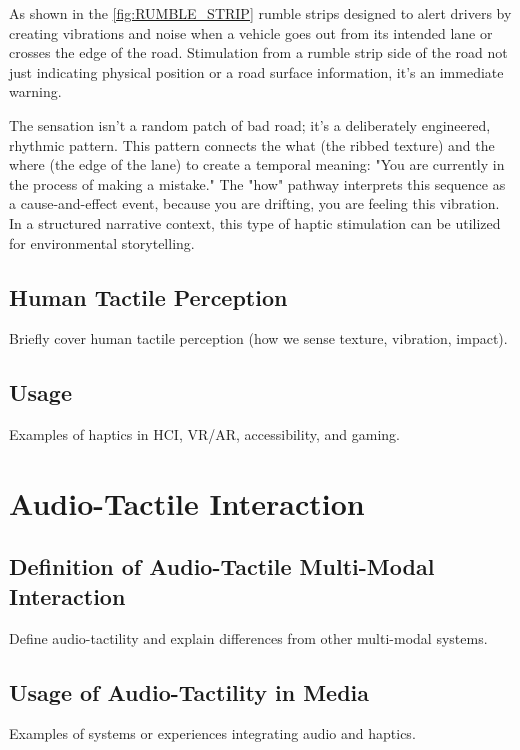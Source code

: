             As shown in the \ref{fig:RUMBLE_STRIP} rumble strips designed to alert drivers by creating vibrations and noise when a vehicle goes out from its intended lane or crosses the edge of the road. Stimulation from a rumble strip side of the road not just indicating physical position or a road surface information, it's an immediate warning.\par

            The sensation isn't a random patch of bad road; it's a deliberately engineered, rhythmic pattern. This pattern connects the what (the ribbed texture) and the where (the edge of the lane) to create a temporal meaning: "You are currently in the process of making a mistake." The "how" pathway interprets this sequence as a cause-and-effect event, because you are drifting, you are feeling this vibration. In a structured narrative context, this type of haptic stimulation can be utilized for environmental storytelling.\par

            \subsection{Human Tactile Perception} Briefly cover human tactile perception (how we sense texture, vibration, impact).
        \subsection{Usage} Examples of haptics in HCI, VR/AR, accessibility, and gaming.
    \section{Audio-Tactile Interaction}
        \subsection{Definition of Audio-Tactile Multi-Modal Interaction} Define audio-tactility and explain differences from other multi-modal systems.
        \subsection{Usage of Audio-Tactility in Media} Examples of systems or experiences integrating audio and haptics.